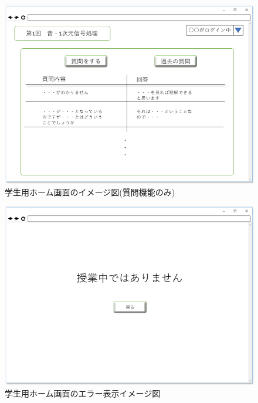 \begin{figure}[phtbp]
  \begin{center}
    \includegraphics[width=1\linewidth,clip]{./img/29.png}
    \caption{学生用ホーム画面のイメージ図(質問機能のみ)}\label{fig:29}
  \end{center}
\end{figure}

\begin{figure}[phtbp]
  \begin{center}
    \includegraphics[width=1\linewidth,clip]{./img/00.png}
    \caption{学生用ホーム画面のエラー表示イメージ図}\label{fig:00}
  \end{center}
\end{figure}

\newpage

